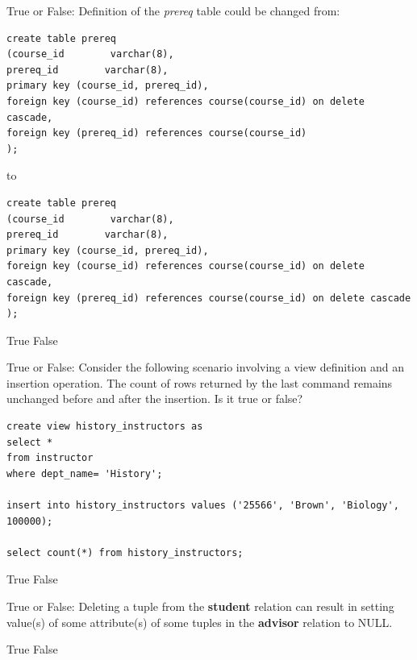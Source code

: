 \documentclass[12pt, addpoints, answers]{exam}
\begin{document}
\begin{questions}
\begin{minipage}{\linewidth}
\question[2]
True or False: Definition of the \textit{prereq} table could be changed from: \par\vspace{0.5em}
\begin{verbatim}
create table prereq
(course_id        varchar(8), 
prereq_id        varchar(8),
primary key (course_id, prereq_id),
foreign key (course_id) references course(course_id) on delete cascade,
foreign key (prereq_id) references course(course_id)
);
\end{verbatim}
to\par\vspace{0.5em}
\begin{verbatim}
create table prereq
(course_id        varchar(8), 
prereq_id        varchar(8),
primary key (course_id, prereq_id),
foreign key (course_id) references course(course_id) on delete cascade,
foreign key (prereq_id) references course(course_id) on delete cascade
);
\end{verbatim}
\begin{checkboxes}
    \CorrectChoice True
    \choice False
\end{checkboxes}
\end{minipage}\vspace{1em}

\begin{minipage}{\linewidth}
\question[3]
True or False: Consider the following scenario involving a view definition and an insertion operation. 
The count of rows returned by the last command remains unchanged before and after the insertion. Is it true or false?\par\vspace{0.5em}
\begin{verbatim}
create view history_instructors as
select * 
from instructor
where dept_name= 'History';

insert into history_instructors values ('25566', 'Brown', 'Biology', 100000);

select count(*) from history_instructors;
\end{verbatim}
\begin{checkboxes}
    \CorrectChoice True
    \choice False
\end{checkboxes}
\end{minipage}\vspace{1em}

\begin{minipage}{\linewidth}
\question[2]
True or False: Deleting a tuple from the \textbf{student} relation can result in setting value(s) of some attribute(s) 
of some tuples in the \textbf{advisor} relation to NULL.\par\vspace{0.5em}
\begin{checkboxes}
    \choice True
    \CorrectChoice False
\end{checkboxes}
\end{minipage}\vspace{1em}


\end{questions}
\end{document}
